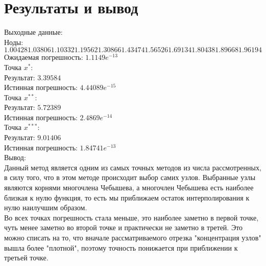 \documentclass[10pt]{scrartcl}
\begin{document}
\section*{Результаты и вывод}\noindent
Выходные данные:\\
Ноды:\\ 
$1.00428 1.03806 1.10332 1.19562 1.30866 1.43474 1.56526 1.69134 1.80438 1.89668 1.96194$ \\
Ожидаемая погрешность: $1.1149e^{-13}$\\
Точка $x^{*}$:\\
Результат: $3.39584$\\
Истинная погрешность: $4.44089e^{-15}$\\
Точка $x^{**}$:\\
Результат: $5.72389$\\
Истинная погрешность: $2.4869e^{-14}$\\
Точка $x^{***}$:\\
Результат: $9.01406$\\
Истинная погрешность: $1.84741e^{-13}$\\
Вывод:\\
Данный метод является одним из самых точных методов из числа рассмотренных, в силу того, что в этом методе происходит выбор самих узлов. Выбранные узлы являются корнями многочлена Чебышева, а многочлен Чебышева есть наиболее близкая к нулю функция, то есть мы приближаем остаток интерполирования к нулю наилучшим образом.\\
Во всех точках погрешность стала меньше, это наиболее заметно в первой точке, чуть менее заметно во второй точке
и практически не заметно в третей. Это можно списать на то, что вначале рассматриваемого отрезка 
"концентрация узлов" вышла более "плотной", поэтому точность понижается при приближении к третьей точке.\\
\end{document}

